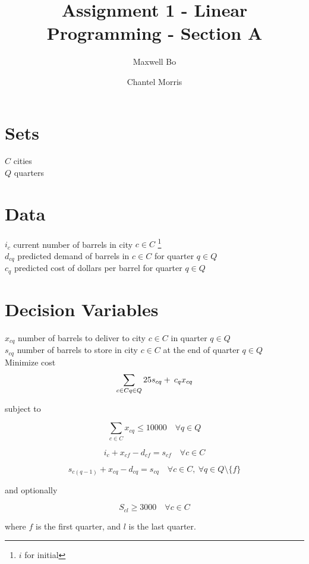 \documentclass[a4paper]{article}
\title{Assignment 1 - Linear Programming - Section A}
\author{Maxwell Bo  \and Chantel Morris}
\begin{document}
 

\maketitle

\section*{Sets}

$C$ cities\\
$Q$ quarters\\

\section*{Data}

$i_c$ current number of barrels in city $c \in C$ \footnote{$i$ for initial}\\
$d_{cq}$ predicted demand of barrels in $c \in C$ for quarter $q \in Q$\\
$c_q$ predicted cost of dollars per barrel for quarter $q \in Q$\\

\section*{Decision Variables}

$x_{cq}$ number of barrels to deliver to city $c \in C$ in quarter $q \in Q$\\
$s_{cq}$ number of barrels to store in city $c \in C$ at the end of quarter $q \in Q$\\

Minimize cost
\[
\sum_{c \in C\\ q \in Q} 25 s_{cq} +\: c_q x_{cq}
\]

subject to

\[
\sum_{c \in C} x_{cq} \leq 10000 \quad \forall q \in Q
\]

\[
i_{c} +  x_{cf} - d_{cf} = s_{cf} \quad \forall c \in C
\]

\[
s_{c(q - 1)} +  x_{cq} - d_{cq} = s_{cq} \quad \forall c \in C,\  \forall q \in Q \setminus \{ f \}
\]

and optionally

\[
    S_{cl} \geq 3000 \quad \forall c \in C
\]

where $f$ is the first quarter, and $l$ is the last quarter. 
\end{document}
